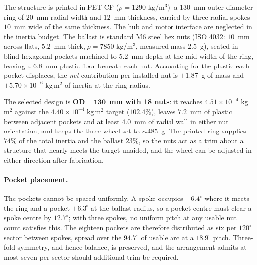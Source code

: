 
The structure is printed in PET-CF ($\rho = 1290$ kg/m$^3$): a
$130$~mm outer-diameter ring of $20$~mm radial width and $12$~mm thickness,
carried by three radial spokes $10$~mm wide of the same thickness. The hub and
motor interface are neglected in the inertia budget. The ballast is standard
M6 steel hex nuts (ISO 4032: $10$~mm across flats, $5.2$~mm thick,
$\rho = 7850$ kg/m$^3$, measured mass $2.5$~g), seated in blind hexagonal
pockets machined to $5.2$~mm depth at the mid-width of the ring, leaving a
$6.8$~mm plastic floor beneath each nut. Accounting for the plastic each
pocket displaces, the \emph{net} contribution per installed nut is $+1.87$~g
of mass and $+5.70\times10^{-6}$ kg\,m$^2$ of inertia at the ring radius.

The selected design is $\mathbf{OD = 130}$~\textbf{mm with 18 nuts}: it reaches
$4.51\times10^{-4}$ kg\,m$^2$ against the $4.40\times10^{-4}$ kg\,m$^2$ target
($102.4\%$), leaves $7.2$~mm of plastic between adjacent pockets and at least
$4.0$~mm of radial wall in either nut orientation, and keeps the three-wheel
set to $\sim\!485$~g. The printed ring supplies $74\%$ of the total inertia
and the ballast $23\%$, so the nuts act as a trim about a structure that
nearly meets the target unaided, and the wheel can be adjusted in either
direction after fabrication.

\paragraph{Pocket placement.} The pockets cannot be spaced uniformly. A spoke
occupies $\pm6.4^\circ$ where it meets the ring and a pocket $\pm6.3^\circ$ at
the ballast radius, so a pocket centre must clear a spoke centre by
$12.7^\circ$; with three spokes, no uniform pitch at any usable nut count
satisfies this. The eighteen pockets are therefore distributed as six per
$120^\circ$ sector between spokes, spread over the $94.7^\circ$ of usable arc
at a $18.9^\circ$ pitch. Three-fold symmetry, and hence balance, is preserved,
and the arrangement admits at most seven per sector should additional trim be
required.

